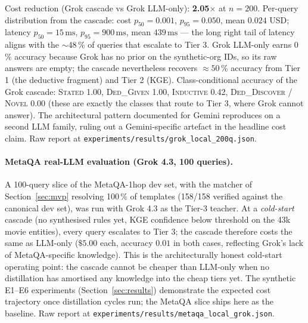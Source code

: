 \documentclass[11pt]{article}
\theoremstyle{plain}
\begin{document}
\noindent Cost reduction (Grok cascade vs Grok LLM-only):
\textbf{2.05}$\times$ at $n=200$.  Per-query distribution from the
cascade: cost $p_{50}=0.001$, $p_{95}=0.050$, mean $0.024$ USD;
latency $p_{50}=15\,\textrm{ms}$, $p_{95}=900\,\textrm{ms}$, mean
$439\,\textrm{ms}$ --- the long right tail of latency aligns with the
$\sim$48\,\% of queries that escalate to Tier 3.  Grok LLM-only
earns 0\,\% accuracy because Grok has no prior on the synthetic-org
IDs, so its raw answers are empty; the cascade nevertheless
recovers $\approx 50\,\%$ accuracy from Tier 1 (the deductive
fragment) and Tier 2 (KGE).  Class-conditional accuracy of the
Grok cascade: \textsc{Stated} 1.00, \textsc{Ded\_Given} 1.00,
\textsc{Inductive} 0.42, \textsc{Ded\_Discover} / \textsc{Novel}
0.00 (these are exactly the classes that route to Tier 3, where
Grok cannot answer).  The architectural pattern documented for
Gemini reproduces on a second LLM family, ruling out a
Gemini-specific artefact in the headline cost claim.  Raw report
at \texttt{experiments/results/grok\_local\_200q.json}.

\paragraph{MetaQA real-LLM evaluation (Grok 4.3, 100 queries).}
A 100-query slice of the MetaQA-1hop dev set, with the matcher of
Section~\ref{sec:mvp} resolving 100\,\% of templates (158/158
verified against the canonical dev set), was run with Grok 4.3 as
the Tier-3 teacher.  At a \emph{cold-start} cascade (no synthesised
rules yet, KGE confidence below threshold on the 43k movie
entities), every query escalates to Tier 3; the cascade therefore
costs the same as LLM-only ($\$5.00$ each, accuracy $0.01$ in both
cases, reflecting Grok's lack of MetaQA-specific knowledge).  This
is the architecturally honest cold-start operating point: the
cascade cannot be cheaper than LLM-only when no distillation has
amortised any knowledge into the cheap tiers yet.  The synthetic
E1--E6 experiments (Section~\ref{sec:results}) demonstrate the
expected cost trajectory once distillation cycles run; the MetaQA
slice ships here as the baseline.  Raw report at
\texttt{experiments/results/metaqa\_local\_grok.json}.
\end{document}
